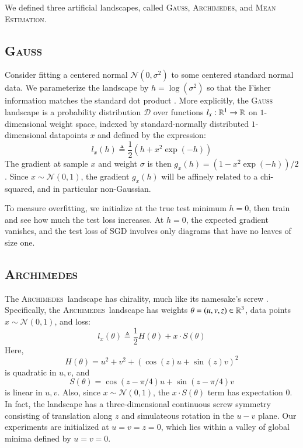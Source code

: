 \documentclass[openany, notitlepage, justified]{tufte-book}
\theoremstyle{plain}
\theoremstyle{definition}
\newcommand{\wrap}[1]{\left(#1\right)}
\newcommand{\Dd}{\mathcal{D}}
\newcommand{\Nn}{\mathcal{N}}   \newcommand{\NN}{\mathbb{N}}
\newcommand{\Gauss}{\textsc{Gauss}}
\newcommand{\Archimedes}{\textsc{Archimedes}}
\newcommand{\MeanEstimation}{\textsc{Mean Estimation}}
\begin{document}
        We defined three artificial landscapes, called
        \Gauss, \Archimedes, and \MeanEstimation.

        \subsection{\Gauss}
            Consider fitting a centered normal $\Nn(0, \sigma^2)$ to some
            centered standard normal data.  We parameterize the landscape by
            $h=\log(\sigma^2)$ so that the Fisher information matches the
            standard dot product \citep{am98}.   
            More explicitly, the \Gauss\, landscape is a probability
            distribution $\Dd$ over functions $l_x:\mathbb{R}^1\to \mathbb{R}$ on
            $1$-dimensional weight space, indexed by standard-normally
            distributed $1$-dimensional datapoints $x$ and defined by the
            expression:
            $$
                l_x(h)
                \triangleq
                \frac{1}{2} \wrap{h + x^2 \exp(-h)}
            $$
            The gradient at sample $x$ and weight $\sigma$ is then $g_x(h) =
            (1-x^2\exp(-h))/2$.  Since $x\sim \Nn(0, 1)$, the gradient $g_x(h)$
            will be affinely related to a chi-squared, and in particular
            non-Gaussian.
            
            To measure overfitting, we initialize at the true test minimum
            $h=0$, then train and see how much the test loss increases.  At
            $h=0$, the expected gradient vanishes, and the test loss of SGD
            involves only diagrams that have no leaves of size one.
            
        \subsection{\Archimedes}
            The \Archimedes\, landscape has chirality, much like its namesake's
            screw \citep{vi00}.  Specifically, the \Archimedes\ landscape has
            weights     $\theta = (u,v,z) \in \mathbb{R}^3$,
            data points $x \sim \Nn(0, 1)$,
            and loss:
            $$
                l_x(\theta)
                \triangleq
                \frac{1}{2} H(\theta) + x \cdot S(\theta)
            $$
            Here,
            $$
                H(\theta) = u^2 + v^2 + (\cos(z) u + \sin(z) v)^2
            $$
            is quadratic in $u, v$, and
            $$
                S(\theta) = \cos(z-\pi/4) u + \sin(z-\pi/4) v
            $$
            is linear in $u, v$.
            Also, since $x \sim \Nn(0,1)$, the $x \cdot S(\theta)$ term has
            expectation $0$.
            In fact, the landscape has a three-dimensional continuous screw
            symmetry consisting of translation along $z$ and simulateous
            rotation in the $u-v$ plane.  Our experiments are initialized at
            $u=v=z=0$, which lies within a valley of global minima defined by
            $u=v=0$.  
\end{document}

